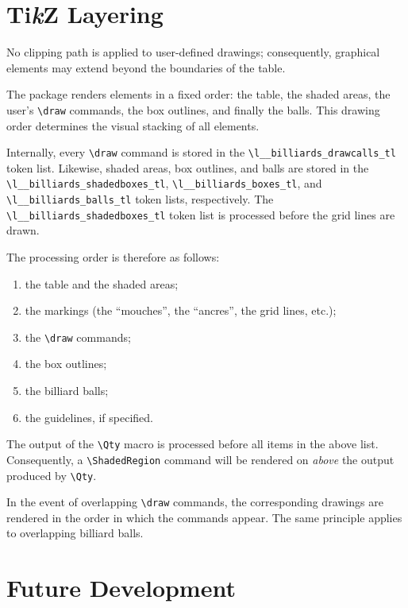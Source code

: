 \documentclass[11pt,a4paper]{ltxdoc}
\def\bluett#1{{\color{blue}\texttt{#1}}}
\begin{document}
\section{Ti\textit{k}Z Layering}

No clipping path is applied to user-defined drawings; consequently, graphical elements may extend beyond the boundaries of the table.

The package renders elements in a fixed order: the table, the shaded areas, the user's \bluett{\textbackslash draw} commands, the box outlines, and finally the balls. This drawing order determines the visual stacking of all elements.

Internally, every \bluett{\textbackslash draw} command is stored in the \verb|\l__billiards_drawcalls_tl| token list. Likewise, shaded areas, box outlines, and balls are stored in the \verb|\l__billiards_shadedboxes_tl|, \verb|\l__billiards_boxes_tl|, and \verb|\l__billiards_balls_tl| token lists, respectively. The \verb|\l__billiards_shadedboxes_tl| token list is processed before the grid lines are drawn.

The processing order is therefore as follows:
\begin{enumerate}
    \item the table and the shaded areas;
    \item the markings (the ``mouches'', the ``ancres'', the grid lines, etc.);
    \item the \bluett{\textbackslash draw} commands;
    \item the box outlines;
    \item the billiard balls;
    \item the guidelines, if specified.
\end{enumerate}

The output of the \bluett{\textbackslash Qty} macro is processed before all items in the above list. Consequently, a \bluett{\textbackslash ShadedRegion} command will be rendered on \textit{above} the output produced by \bluett{\textbackslash Qty}.

In the event of overlapping \bluett{\textbackslash draw} commands, the corresponding drawings are rendered in the order in which the commands appear. The same principle applies to overlapping billiard balls.

\section{Future Development}
\end{document}
